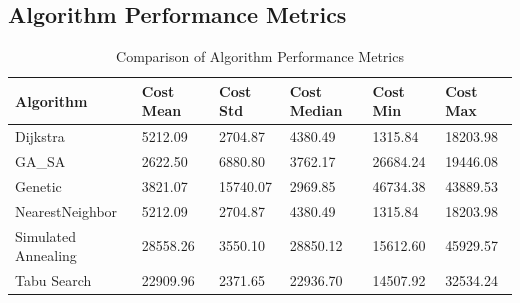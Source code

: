 \documentclass{article}
\begin{document}
    \subsection{Algorithm Performance Metrics}

    \begin{table}[h!]
        \centering
        \caption{Comparison of Algorithm Performance Metrics}
        \label{tab:performance_metrics}
        \begin{tabularx}{\textwidth}{|l|X|X|X|X|X|}
            \hline
            \textbf{Algorithm}  & \textbf{Cost Mean} & \textbf{Cost Std} & \textbf{Cost Median} & \textbf{Cost Min} & \textbf{Cost Max} \\
            \hline
            Dijkstra            & 5212.09            & 2704.87           & 4380.49              & 1315.84           & 18203.98          \\
            GA\_SA              & 2622.50            & 6880.80           & 3762.17              & 26684.24          & 19446.08          \\
            Genetic             & 3821.07            & 15740.07          & 2969.85              & 46734.38          & 43889.53          \\
            NearestNeighbor     & 5212.09            & 2704.87           & 4380.49              & 1315.84           & 18203.98          \\
            Simulated Annealing & 28558.26           & 3550.10           & 28850.12             & 15612.60          & 45929.57          \\
            Tabu Search         & 22909.96           & 2371.65           & 22936.70             & 14507.92          & 32534.24          \\
            \hline
        \end{tabularx}

        \vspace{1em}


\end{table}
\end{document}
